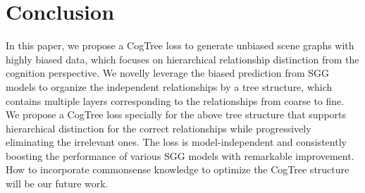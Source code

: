 \documentclass[letterpaper]{article} \usepackage{aaai21}  \usepackage{times}  \usepackage{helvet} \usepackage{courier}  \usepackage[hyphens]{url}  \usepackage{graphicx} \urlstyle{rm} \def\UrlFont{\rm}  \usepackage{natbib}  \usepackage{caption} \frenchspacing  \setlength{\pdfpagewidth}{8.5in}  \setlength{\pdfpageheight}{11in}  \usepackage{amsmath,amsthm}
\begin{document}
\section{Conclusion}
In this paper, we propose a CogTree loss to generate  unbiased scene graphs with highly biased data, which focuses on hierarchical relationship distinction from the cognition perspective.  We novelly leverage the biased prediction from SGG models to organize the independent relationships by a tree structure, which contains multiple layers corresponding to the relationships from coarse to fine. We propose a CogTree loss specially for the above tree structure that supports hierarchical distinction for the correct relationships while progressively eliminating the irrelevant ones. The loss is model-independent and consistently boosting the performance of various SGG models with remarkable improvement. How to incorporate commonsense knowledge to optimize the CogTree structure will be our future work.



\end{document}
